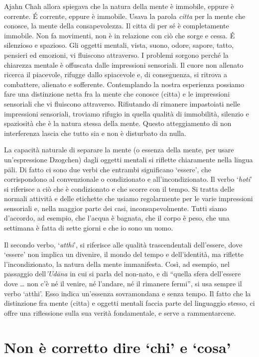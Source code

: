 Ajahn Chah allora spiegava che la natura della mente è immobile, eppure è corrente. É corrente, eppure è immobile. Usava la parola \textit{citta} per la mente che conosce, la mente della consapevolezza. Il citta di per sé è completamente immobile. Non fa movimenti, non è in relazione con ciò che sorge e cessa. É silenzioso e spazioso. Gli oggetti mentali, vista, suono, odore, sapore, tatto, pensieri ed emozioni, vi fluiscono attraverso. I problemi sorgono perché la chiarezza mentale è offuscata dalle impressioni sensoriali. Il cuore non allenato ricerca il piacevole, rifugge dallo spiacevole e, di conseguenza, si ritrova a combattere, alienato e sofferente. Contemplando la nostra esperienza possiamo fare una distinzione netta fra la mente che conosce (citta) e le impressioni sensoriali che vi fluiscono attraverso. Rifiutando di rimanere impastoiati nelle impressioni sensoriali, troviamo rifugio in quella qualità di immobilità, silenzio e spaziosità che è la natura stessa della mente. Questo atteggiamento di non interferenza lascia che tutto sia e non è disturbato da nulla. 

La capacità naturale di separare la mente (o essenza della mente, per usare un'espressione Dzogchen) dagli oggetti mentali si riflette chiaramente nella lingua pāli. Di fatto ci sono due verbi che entrambi significano `essere', che corrispondono al convenzionale o condizionato e all'incondizionato. Il verbo `\textit{hoti}' si riferisce a ciò che è condizionato e che scorre con il tempo. Si tratta delle normali attività e delle etichette che usiamo regolarmente per le varie impressioni sensoriali e, nella maggior parte dei casi, inconsapevolmente. Tutti siamo d'accordo, ad esempio, che l'acqua è bagnata, che il corpo è peso, che una settimana è fatta di sette giorni e che io sono un uomo.

Il secondo verbo, `\textit{atthi}', si riferisce alle qualità trascendentali dell'essere, dove `essere' non implica un divenire, il mondo del tempo e dell'identità, ma riflette l'incondizionato, la natura della mente immanifesta. Così, ad esempio, nel passaggio dell\textit{'Udāna} in cui si parla del non-nato, e di ``quella sfera dell'essere dove \ldots{} non c'è né il venire, né l'andare, né il rimanere fermi'', si usa sempre il verbo `atthi'. Esso indica un'essenza sovramondana e senza tempo. Il fatto che la distinzione fra mente (citta) e oggetti mentali faccia parte del linguaggio stesso, ci offre una riflessione sulla sua verità fondamentale, e serve a rammentarcene.

\section*{Non \`e corretto dire `chi' e `cosa' }

